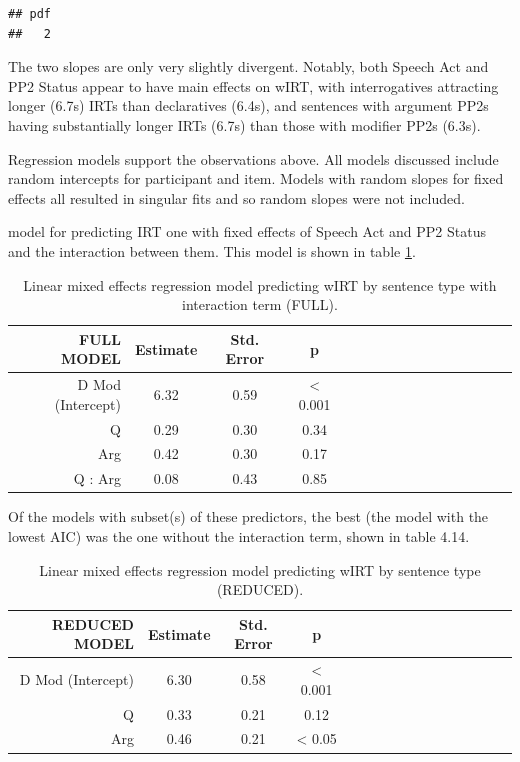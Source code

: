 \documentclass[12pt,oneside]{book}
\begin{document}
\begin{verbatim}
## pdf 
##   2
\end{verbatim}

The two slopes are only very slightly divergent. Notably, both Speech Act and PP2 Status appear to have main effects on wIRT, with interrogatives attracting longer (6.7s) IRTs than declaratives (6.4s), and sentences with argument PP2s having substantially longer IRTs (6.7s) than those with modifier PP2s (6.3s).

Regression models support the observations above. All models discussed include random intercepts for participant and item. Models with random slopes for fixed effects all resulted in singular fits and so random slopes were not included.

 model for predicting IRT  one with fixed effects of Speech Act and PP2 Status and the interaction between them. This model is shown in table \ref{tab:hyp}.

\begin{table}[!h]

\caption{\label{tab:hyp}Linear mixed effects regression model predicting wIRT by sentence type with interaction term (FULL).}
\centering
\begin{tabular}{rcccrcccrcccrccc}
\toprule
FULL MODEL & Estimate & Std. Error & p\\
\midrule
D Mod (Intercept) & 6.32 & 0.59 & < 0.001\\
Q & 0.29 & 0.30 & 0.34\\
Arg & 0.42 & 0.30 & 0.17\\
Q : Arg & 0.08 & 0.43 & 0.85\\
\bottomrule
\end{tabular}
\end{table}

Of the models with subset(s) of these predictors, the best (the model with the lowest AIC) was the one without the interaction term, shown in table 4.14.

\begin{table}[!h]

\caption{\label{tab:redirt}Linear mixed effects regression model predicting wIRT by sentence type (REDUCED).}
\centering
\begin{tabular}{rcccrcccrcccrccc}
\toprule
REDUCED MODEL & Estimate & Std. Error & p\\
\midrule
D Mod (Intercept) & 6.30 & 0.58 & < 0.001\\
Q & 0.33 & 0.21 & 0.12\\
Arg & 0.46 & 0.21 & < 0.05\\
\bottomrule
\end{tabular}
\end{table}
\end{document}
